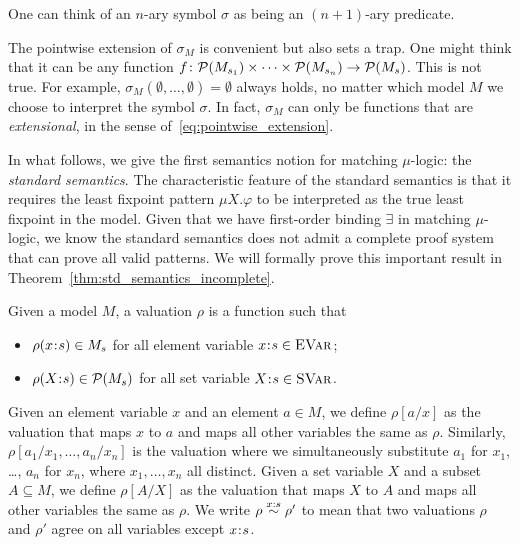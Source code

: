 \documentclass{amsart}
\begin{document}
\begin{remark}

One can think of an $n$-ary symbol $\sigma$
as being an $(n+1)$-ary predicate.

\end{remark}

\begin{remark}

The pointwise extension of $\sigma_M$ is convenient but also sets a trap.
One might think that it can be any function
$f \colon \mathcal{P}(M_{s_1}) \times \dots \times \mathcal{P}( M_{s_n}) \to \mathcal{P}(M_s)$.
This is not true.
For example, $\sigma_M(\emptyset,\dots,\emptyset) = \emptyset$ always holds,
no matter which model $M$ we choose to interpret the symbol $\sigma$.
In fact, $\sigma_M$ can only be functions that are \emph{extensional},
in the sense of~\eqref{eq:pointwise_extension}.

\end{remark}

In what follows, we give the first semantics notion for
matching $\mu$-logic: the \emph{standard semantics}. 
The characteristic feature of the standard semantics
is that it requires the least fixpoint pattern $\mu X . \varphi$
to be interpreted as the true least fixpoint in the model.
Given that we have first-order binding $\exists$ in matching $\mu$-logic,
we know the standard semantics does not admit a complete proof system
that can prove all valid patterns.
We will formally prove this important result in Theorem~\ref{thm:std_semantics_incomplete}.

\begin{definition}

Given a model $M$, a valuation $\rho$ is a function such that
\begin{itemize}
\item $\rho(x \mathbin{\!:\!} s) \in M_s$ for all element variable $x \mathbin{\!:\!} s \in {\normalfont\textsc{EVar}}$;
\item $\rho(X \mathbin{\!:\!} s) \in \mathcal{P}(M_s)$
for all set variable $X \mathbin{\!:\!} s \in {\normalfont\textsc{SVar}}$.
\end{itemize}
Given an element variable $x$ and an element $a \in M$, 
we define $\rho[a/x]$ as the valuation
that maps $x$ to $a$
and maps all other variables the same as $\rho$.
Similarly, $\rho[a_1/x_1, \dots, a_n/x_n]$ is the valuation
where we simultaneously substitute $a_1$ for $x_1$, \dots,
$a_n$ for $x_n$, where $x_1,\dots,x_n$ all distinct.
Given a set variable $X$ and a subset $A \subseteq M$,
we define $\rho[A / X]$ as the valuation
that maps $X$ to $A$ and maps all other variables the same as $\rho$.
We write $\rho \overset{x : s}{\sim} \rho'$ 
to mean that two valuations $\rho$ and $\rho'$ 
agree on all variables except $x \mathbin{\!:\!} s$. 

\end{definition}
\end{document}
